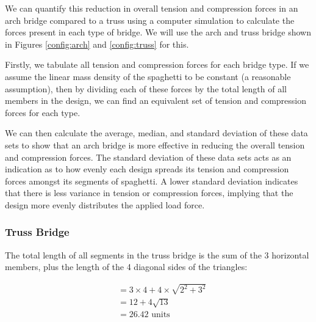 \documentclass[a4paper,11pt]{article}
\begin{document}
We can quantify this reduction in overall tension and compression forces in an
arch bridge compared to a truss using a computer simulation to calculate the
forces present in each type of bridge.
We will use the arch and truss bridge shown in Figures \ref{config:arch} and
\ref{config:truss} for this.

Firstly, we tabulate all tension and compression forces for each bridge type.
If we assume the linear mass density of the spaghetti to be constant (a
reasonable assumption), then by dividing each of these forces by the total
length of all members in the design, we can find an equivalent set of tension
and compression forces for each type.

We can then calculate the average, median, and standard deviation of these data
sets to show that an arch bridge is more effective in reducing the overall
tension and compression forces.
The standard deviation of these data sets acts as an indication as to how evenly
each design spreads its tension and compression forces amongst its segments of
spaghetti.
A lower standard deviation indicates that there is less variance in tension or
compression forces, implying that the design more evenly distributes the applied
load force.



\subsubsection{Truss Bridge}

The total length of all segments in the truss bridge is the sum of the 3
horizontal members, plus the length of the 4 diagonal sides of the triangles:

$$
\begin{aligned}
& = 3 \times 4 + 4 \times \sqrt{2^2 + 3^2} \\
& = 12 + 4\sqrt{13} \\
& = 26.42\mbox{ units} \\
\end{aligned}
$$
\end{document}
